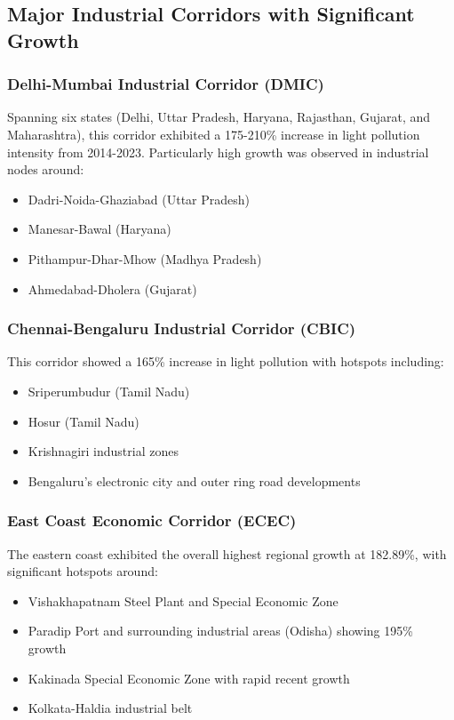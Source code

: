 \documentclass[12pt,a4paper]{article}
\begin{document}
\subsection{Major Industrial Corridors with Significant Growth}

\subsubsection{Delhi-Mumbai Industrial Corridor (DMIC)}
Spanning six states (Delhi, Uttar Pradesh, Haryana, Rajasthan, Gujarat, and Maharashtra), this corridor exhibited a 175-210\% increase in light pollution intensity from 2014-2023. Particularly high growth was observed in industrial nodes around:

\begin{itemize}
    \item Dadri-Noida-Ghaziabad (Uttar Pradesh)
    \item Manesar-Bawal (Haryana)
    \item Pithampur-Dhar-Mhow (Madhya Pradesh)
    \item Ahmedabad-Dholera (Gujarat)
\end{itemize}

\subsubsection{Chennai-Bengaluru Industrial Corridor (CBIC)}
This corridor showed a 165\% increase in light pollution with hotspots including:

\begin{itemize}
    \item Sriperumbudur (Tamil Nadu)
    \item Hosur (Tamil Nadu)
    \item Krishnagiri industrial zones
    \item Bengaluru's electronic city and outer ring road developments
\end{itemize}

\subsubsection{East Coast Economic Corridor (ECEC)}
The eastern coast exhibited the overall highest regional growth at 182.89\%, with significant hotspots around:

\begin{itemize}
    \item Vishakhapatnam Steel Plant and Special Economic Zone
    \item Paradip Port and surrounding industrial areas (Odisha) showing 195\% growth
    \item Kakinada Special Economic Zone with rapid recent growth
    \item Kolkata-Haldia industrial belt
\end{itemize}
\end{document}
